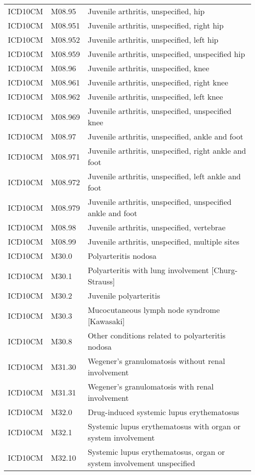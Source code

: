 \begin{longtable}{p{}p{}p{}}
  ICD10CM & M08.95 & Juvenile arthritis, unspecified, hip \\ 
  ICD10CM & M08.951 & Juvenile arthritis, unspecified, right hip \\ 
  ICD10CM & M08.952 & Juvenile arthritis, unspecified, left hip \\ 
  ICD10CM & M08.959 & Juvenile arthritis, unspecified, unspecified hip \\ 
  ICD10CM & M08.96 & Juvenile arthritis, unspecified, knee \\ 
  ICD10CM & M08.961 & Juvenile arthritis, unspecified, right knee \\ 
  ICD10CM & M08.962 & Juvenile arthritis, unspecified, left knee \\ 
  ICD10CM & M08.969 & Juvenile arthritis, unspecified, unspecified knee \\ 
  ICD10CM & M08.97 & Juvenile arthritis, unspecified, ankle and foot \\ 
  ICD10CM & M08.971 & Juvenile arthritis, unspecified, right ankle and foot \\ 
  ICD10CM & M08.972 & Juvenile arthritis, unspecified, left ankle and foot \\ 
  ICD10CM & M08.979 & Juvenile arthritis, unspecified, unspecified ankle and foot \\ 
  ICD10CM & M08.98 & Juvenile arthritis, unspecified, vertebrae \\ 
  ICD10CM & M08.99 & Juvenile arthritis, unspecified, multiple sites \\ 
  ICD10CM & M30.0 & Polyarteritis nodosa \\ 
  ICD10CM & M30.1 & Polyarteritis with lung involvement [Churg-Strauss] \\ 
  ICD10CM & M30.2 & Juvenile polyarteritis \\ 
  ICD10CM & M30.3 & Mucocutaneous lymph node syndrome [Kawasaki] \\ 
  ICD10CM & M30.8 & Other conditions related to polyarteritis nodosa \\ 
  ICD10CM & M31.30 & Wegener's granulomatosis without renal involvement \\ 
  ICD10CM & M31.31 & Wegener's granulomatosis with renal involvement \\ 
  ICD10CM & M32.0 & Drug-induced systemic lupus erythematosus \\ 
  ICD10CM & M32.1 & Systemic lupus erythematosus with organ or system involvement \\ 
  ICD10CM & M32.10 & Systemic lupus erythematosus, organ or system involvement unspecified \\ 

\end{longtable}
